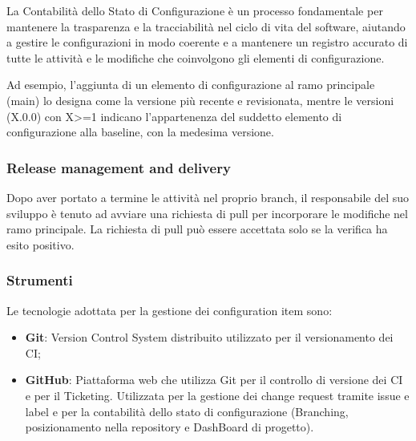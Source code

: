 La Contabilità dello Stato di Configurazione è un processo fondamentale per mantenere la trasparenza e la tracciabilità nel ciclo di vita del software, aiutando a gestire le configurazioni in modo coerente e a mantenere un registro accurato di tutte le attività e le modifiche che coinvolgono gli elementi di configurazione.\\
\vspace{0.2cm}

Ad esempio, l'aggiunta di un elemento di configurazione al ramo principale (main) lo designa come la versione più recente e revisionata, mentre le versioni (X.0.0) con X>=1 indicano l'appartenenza del suddetto elemento di configurazione alla baseline, con la medesima versione.

\subsubsection{Release management and delivery}
Dopo aver portato a termine le attività nel proprio branch, il responsabile del suo sviluppo è tenuto ad avviare una richiesta di pull per incorporare le modifiche nel ramo principale. La richiesta di pull può essere accettata solo se la verifica ha esito positivo.

\subsubsection{Strumenti}
Le tecnologie adottata per la gestione dei configuration item sono:
\begin{itemize}
    \item \textbf{Git}: Version Control System distribuito utilizzato per il versionamento dei CI;
    \item \textbf{GitHub}: Piattaforma web che utilizza Git per il controllo di versione dei CI e per il Ticketing.
          Utilizzata per la gestione dei change request tramite issue e label e per la contabilità dello stato di configurazione (Branching, posizionamento nella repository e DashBoard di progetto).
\end{itemize}
